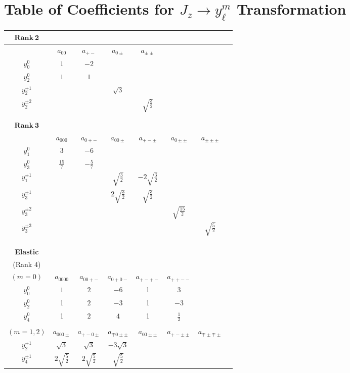\documentclass[10pt,a4paper]{article}
\begin{document}
\begin{figure}
\section{Table of Coefficients for $J_z\rightarrow y_{\ell}^m$ Transformation}\label{cgcoef}
\begin{tabular}{c|ccccccc}
$\mathbf{Rank\ 2}$ \\
\hline
& $a_{00}$ & $a_{+-}$ & $a_{0\pm}$ & $a_{\pm\pm}$ \\
$y_0^0$  & $1$ & $-2$ \\
$y_2^0$  & $1$ & $1$ \\
$y_2^{\pm 1}$  &  & & $\sqrt{3}$ \\
$y_2^{\pm 2}$  &  & & & $\sqrt{\frac{3}{2}}$
\\
\\
\\
$\mathbf{Rank\ 3}$\\
\hline
 & $a_{000}$ & $a_{0+-}$ & $a_{00\pm}$ & $a_{+-\pm}$  & $a_{0\pm\pm}$ & $a_{\pm\pm\pm}$ \\
$y_1^0$  & $3$ & $-6$ \\
$y_3^0$  & $\frac{15}{7}$ & $-\frac{5}{7}$ \\
$y_1^{\pm 1}$  &  & & $\sqrt{\frac{3}{2}}$ & $-2\sqrt{\frac{3}{2}}$\\
$y_3^{\pm 1}$  &  & & $2\sqrt{\frac{3}{2}}$ & $\sqrt{\frac{3}{2}}$\\
$y_3^{\pm 2}$  &  & & & & $\sqrt{\frac{15}{2}}$\\
$y_3^{\pm 3}$  &  & & & & & $\sqrt{\frac{5}{2}}$\\
\\
\\
\\
\textbf{Elastic}\\
(Rank 4) \\
 \hline 
$(m=0)$& $a_{0000}$ & $a_{00+-}$ & $a_{0+0-}$ & $a_{+-+-}$  & $a_{++--}$ \\
$y_0^{0}$  & $1$ & $2$ &$-6$ & 1 & 3 \\
$y_2^0$  & 1 & $2$ & $-3$ & 1 & $-3$\\
$y_4^0$ & 1 & $2$ & $4$ & 1 & $\frac{1}{2}$\\
 \\
$(m=1,2)$& $a_{000\pm}$ & $a_{+- 0 \pm}$  & $a_{\mp 0 \pm\pm}$ & $a_{00\pm\pm}$ & $a_{+- \pm \pm}$  & $a_{\mp \pm \mp\pm}$ \\
$y_2^{\pm 1}$  & $\sqrt{3}$ & $\sqrt{3}$ &  $-3\sqrt{3}$\\
$y_4^{\pm 1}$  & $2\sqrt{\frac{5}{2}}$ & $2\sqrt{\frac{5}{2}}$ & $\sqrt{\frac{5}{2}}$  \\

\end{tabular}
\end{figure}
\end{document}

